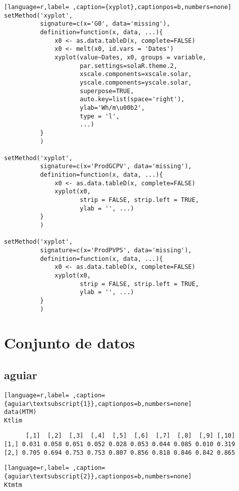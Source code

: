 \begin{lstlisting}[language=r,label= ,caption={xyplot},captionpos=b,numbers=none]
setMethod('xyplot',
          signature=c(x='G0', data='missing'),
          definition=function(x, data, ...){
              x0 <- as.data.tableD(x, complete=FALSE)              
              x0 <- melt(x0, id.vars = 'Dates')
              xyplot(value~Dates, x0, groups = variable,
                     par.settings=solaR.theme.2,
                     xscale.components=xscale.solar,
                     yscale.components=yscale.solar,
                     superpose=TRUE,
                     auto.key=list(space='right'),
                     ylab='Wh/m\u00b2',
                     type = 'l',
                     ...)     
          }
          )

setMethod('xyplot',
          signature=c(x='ProdGCPV', data='missing'),
          definition=function(x, data, ...){
              x0 <- as.data.tableD(x, complete=FALSE)
              xyplot(x0,
                     strip = FALSE, strip.left = TRUE,
                     ylab = '', ...)
          }
          )

setMethod('xyplot',
          signature=c(x='ProdPVPS', data='missing'),
          definition=function(x, data, ...){
              x0 <- as.data.tableD(x, complete=FALSE)
              xyplot(x0,
                     strip = FALSE, strip.left = TRUE,
                     ylab = '', ...)
          }
          )
\end{lstlisting}
\section{Conjunto de datos}
\label{sec:org73134a1}
\label{sec:conjunto-datos}
\subsection{aguiar}
\label{sec:orgfd6da7e}
\label{subsec:aguiar}
\begin{lstlisting}[language=r,label= ,caption={aguiar\textsubscript{1}},captionpos=b,numbers=none]
data(MTM)
Ktlim
\end{lstlisting}

\begin{verbatim}
      [,1]  [,2]  [,3]  [,4]  [,5]  [,6]  [,7]  [,8]  [,9] [,10]
[1,] 0.031 0.058 0.051 0.052 0.028 0.053 0.044 0.085 0.010 0.319
[2,] 0.705 0.694 0.753 0.753 0.807 0.856 0.818 0.846 0.842 0.865
\end{verbatim}


\begin{lstlisting}[language=r,label= ,caption={aguiar\textsubscript{2}},captionpos=b,numbers=none]
Ktmtm
\end{lstlisting}

